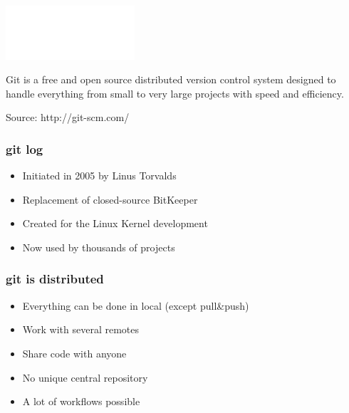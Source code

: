 \begin{frame}
    \begin{center}
        \includegraphics[height=2cm]{git.png}
    \end{center}
    \begin{center}
        Git is a free and open source\pause{} distributed\pause{} version control system\pause{} designed to handle everything from small to very large projects\pause{} with speed and efficiency.
    \end{center}
    \begin{flushright}
        Source: http://git-scm.com/
    \end{flushright}
\end{frame}
\begin{frame}
    \frametitle{git log}
    \begin{itemize}
        \item{Initiated in 2005 by Linus Torvalds}
        \item{Replacement of closed-source BitKeeper}
        \item{Created for the Linux Kernel development}
        \item{Now used by thousands of projects}
    \end{itemize}
\end{frame}
\begin{frame}
    \frametitle{git is distributed}
    \begin{itemize}
        \item Everything can be done in local (except pull\&push)
        \item Work with several remotes
        \item Share code with anyone
        \item No unique central repository
        \item A lot of workflows possible
    \end{itemize}
\end{frame}
